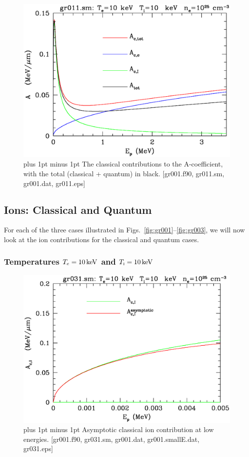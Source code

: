 \documentclass[preprint,12pt,eqsecnum,nofootinbib,amsmath,amssymb]{revtex4}
\newcommand{\smI}{{\rm\scriptscriptstyle I}}
\newcommand{\footnoteskip}{\baselineskip 12pt plus 1pt minus 1pt}
\begin{document}
\begin{figure}[h!]
\includegraphics[scale=0.45]{gr011.eps} 
\vskip-0.8cm 
\caption{\footnoteskip  
  The classical contributions to the {\cal A}-coefficient, with the
  total (classical + quantum) in black.  [gr001.f90, gr011.sm,
  gr001.dat, gr011.eps]
}
\label{fig:gr011}
\end{figure}


\pagebreak
\subsection{Ions: Classical and Quantum}

For each of the three cases illustrated in
Figs.~\ref{fig:gr001}--\ref{fig:gr003}, we will now look at the ion
contributions for the classical and quantum cases.

\subsubsection{Temperatures $T_e=10\,{\rm keV}$ and $T_\smI=10\,{\rm keV}$}

\vskip-2cm 
\begin{figure}[h!]
\includegraphics[scale=0.45]{gr031.eps} 
\vskip-0.8cm 
\caption{\footnoteskip  
  Asymptotic classical ion contribution at low energies. [gr001.f90,
  gr031.sm, gr001.dat, gr001.smallE.dat, gr031.eps]
}
\label{fig:gr031}
\end{figure}
\end{document}
